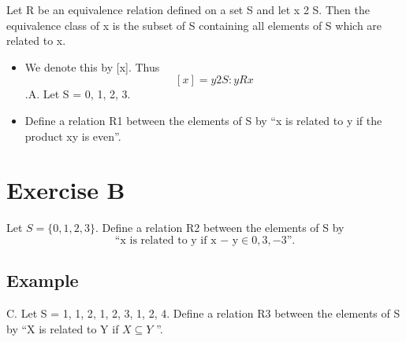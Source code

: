 \documentclass[]{report}
\begin{document}
	
	Let R be an equivalence relation defined on a set S and let x 2 S. 
Then the equivalence class of x is the subset of S containing all
elements of S which are related to x. 


	
	\begin{itemize}
	\item We denote this by [x]. Thus
	\[[x] = {y 2 S : yRx}\].A. Let S = {0, 1, 2, 3}. 
	\item Define a relation R1 between the elements of S by
	“x is related to y if the product xy is even”.
	\end{itemize}




	
\section{Exercise B}
Let $S = \{0, 1, 2, 3\}$. 
Define a relation R2 between the elements of S by
\[\mbox{“x is related to y if x − y} \in {0, 3,−3}”.\]


\subsection{Example}	
C. Let S = {{1}, {1, 2}, {1, 2, 3}, {1, 2, 4}}. 
Define a relation R3 between
the elements of S by “X is related to Y if $X \subseteq Y$ ”.
\end{document}
